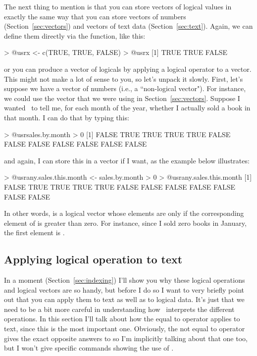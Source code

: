 The next thing to mention is that you can store vectors of logical values in exactly the same way that you can store vectors of numbers (Section~\ref{sec:vectors}) and vectors of text data (Section~\ref{sec:text}). Again, we can define them directly via the  function, like this:
\begin{rblock1}
> @usr{x <- c(TRUE, TRUE, FALSE)}
> @usr{x}
[1]  TRUE  TRUE FALSE
\end{rblock1}
or you can produce a vector of logicals by applying a logical operator to a vector. This might not make a lot of sense to you, so let's unpack it slowly. First, let's suppose we have a vector of numbers (i.e., a ``non-logical vector"). For instance, we could use the  vector that we were using in Section~\ref{sec:vectors}. Suppose I wanted \R\ to tell me, for each month of the year, whether I actually sold a book in that month. I can do that by typing this: 
\begin{rblock1}
> @usr{sales.by.month > 0}
 [1] FALSE  TRUE  TRUE  TRUE  TRUE FALSE FALSE FALSE FALSE FALSE FALSE FALSE
\end{rblock1}
and again, I can store this in a vector if I want, as the example below illustrates:
\begin{rblock1}
> @usr{any.sales.this.month <- sales.by.month > 0}
> @usr{any.sales.this.month}
 [1] FALSE  TRUE  TRUE  TRUE  TRUE FALSE FALSE FALSE FALSE FALSE FALSE FALSE 
\end{rblock1}
In other words,  is a logical vector whose elements are  only if the corresponding element of  is greater than zero. For instance, since I sold zero books in January, the first element is . 


\subsection{Applying logical operation to text~\label{sec:logictext}}

In a moment (Section~\ref{sec:indexing}) I'll show you why these logical operations and logical vectors are so handy, but before I do so I want to very briefly point out that you can apply them to text as well as to logical data. It's just that we need to be a bit more careful in understanding how \R\ interprets the different operations. In this section I'll talk about how the equal to operator \rtext{==} applies to text, since this is the most important one. Obviously, the not equal to operator \rtext{!=} gives the exact opposite answers to \rtext{==} so I'm implicitly talking about that one too, but I won't give specific commands showing the use of \rtext{!=}. 

